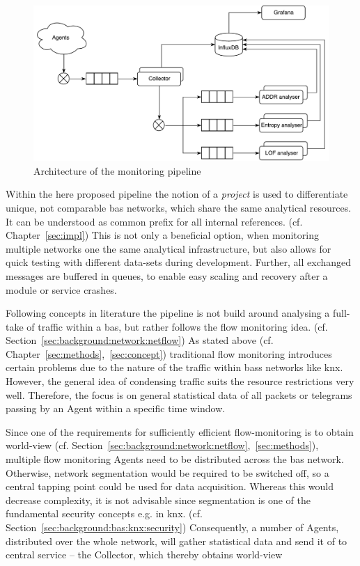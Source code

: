 \begin{figure}[h]
	\centering
	\includegraphics[width=\textwidth]{figures/300-concept-architecture.pdf}
	\caption[Pipeline Architecture]{Architecture of the monitoring pipeline  }
	\label{fig:concept:architecture}
\end{figure}

Within the here proposed pipeline the notion of a \emph{project} is used to differentiate unique, not comparable \gls{bas} networks, which share the same analytical resources. It can be understood as common prefix for all internal references. (cf. Chapter~\ref{sec:impl})
This is not only a beneficial option, when monitoring multiple networks one the same analytical infrastructure, but also allows for quick testing with different data-sets during development.
Further, all exchanged messages are buffered in queues, to enable easy scaling and recovery after a module or service crashes.

Following concepts in literature \parencite[cf.][]{Celeda2012,Pan2014} the pipeline is not build around analysing a full-take of traffic within a \gls{bas}, but rather follows the flow monitoring idea. (cf. Section~\ref{sec:background:network:netflow})
As stated above (cf. Chapter~\ref{sec:methods},~\ref{sec:concept}) traditional flow monitoring introduces certain problems due to the nature of the traffic within \glspl{bas} networks like \gls{knx}. However, the general idea of condensing traffic suits the resource restrictions very well.
Therefore, the focus is on general statistical data of all packets or telegrams passing by an Agent within a specific time window.

Since one of the requirements for sufficiently efficient flow-monitoring is to obtain world-view (cf. Section~\ref{sec:background:network:netflow},~\ref{sec:methods}), multiple flow monitoring Agents need to be distributed across the \gls{bas} network. Otherwise, network segmentation would be required to be switched off, so a central tapping point could be used for data acquisition.
Whereas this would decrease complexity, it is not advisable since segmentation is one of the fundamental security concepts e.g. in \gls{knx}. (cf. Section~\ref{sec:background:bas:knx:security})
Consequently, a number of Agents, distributed over the whole network, will gather statistical data and send it of to central service -- the Collector, which thereby obtains world-view

